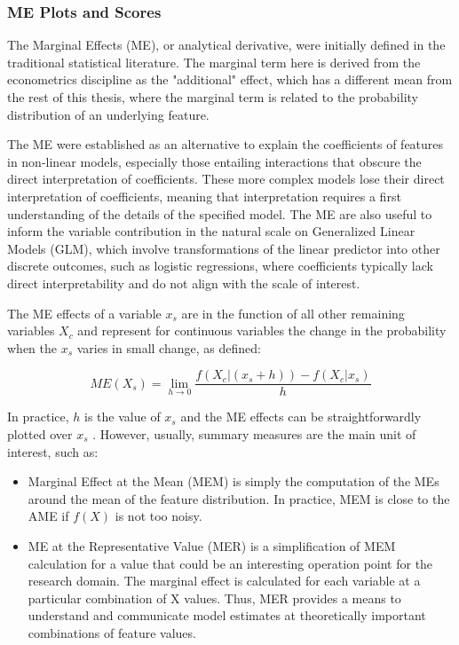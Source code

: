 \subsubsection{ME Plots and Scores}

The Marginal Effects (ME), or analytical derivative, were initially defined in the traditional statistical literature. The marginal term here is derived from the econometrics discipline as the "additional" effect, which has a  different mean from the rest of this thesis, where the marginal term is related to the probability distribution of an underlying feature.

The \gls{ME} were established as an alternative to explain the coefficients of features in non-linear models, especially those entailing interactions that obscure the direct interpretation of coefficients. These more complex models lose their direct interpretation of coefficients, meaning that interpretation requires a first understanding of the details of the specified model\cite{Leeper2021InterpretingMargins, long1997regression}. The \gls{ME} are also useful to inform the variable contribution in the natural scale on Generalized Linear Models (GLM), which involve transformations of the linear predictor into other discrete outcomes, such as logistic regressions, where coefficients typically lack direct interpretability and do not align with the scale of interest.

The \gls{ME} effects of a variable $x_s$ are in the function of all other remaining variables $X_c$ and represent  for continuous variables the change in the probability when the $x_s$ varies in small change, as defined:

\begin{equation}
ME(X_s) = \lim_{{h \to 0}} \frac{{f(X_c|(x_s + h)) - f(X_c|x_s)}}{h}
\label{me}
\end{equation}

In practice, $h$ is the value of $x_s$ and the ME effects can be straightforwardly plotted over $x_s$ . However, usually, summary measures are the main unit of interest, such as:

\begin{itemize}
    \item Marginal Effect at the Mean (MEM) is simply the computation of the MEs around the mean of the feature distribution. In practice, MEM is close to the AME if \(f(X)\) is not too noisy.
\end{itemize}

\begin{itemize}
    \item ME at the Representative Value (MER) is a simpliﬁcation of MEM calculation for a value that could be an interesting operation point for the research domain. The marginal effect is calculated for each variable at a particular combination of X values. Thus, MER provides a means to understand and communicate model estimates at theoretically important combinations of feature values.
\end{itemize}


